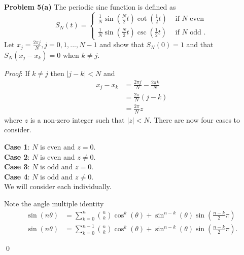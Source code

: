 \documentclass[12pt]{article}
\newcommand{\problem}[1]{\hspace{-4 ex} \large \textbf{Problem #1} }
\renewenvironment{proof}{\hspace{-4 ex} \emph{Proof}:}{\qed}
\begin{document}
\problem{5(a)} The periodic sinc function is defined as
$$
S_N(t) = \begin{cases}
\frac{1}{N} \sin \left(\frac{N}{2}t \right) \cot \left( \frac{1}{2}t \right) & \text{ if } N \text{ even}\\
\frac{1}{N} \sin \left(\frac{N}{2}t \right) \csc \left(\frac{1}{2}t \right) & \text{ if } N \text{ odd .}
\end{cases}
$$
Let $x_j = \frac{2\pi j}{N}, j=0,1,...,N-1$ and show that $S_N(0)=1$ and that \\$S_N(x_j-x_k)=0$ when $k\neq j$.
\bigbreak

\begin{proof} If $k \neq j$ then $\vert j - k \vert < N$ and
	\begin{align*}
		x_j - x_k &= \frac{2\pi j}{N} - \frac{2\pi k}{N} \\
		&= \frac{2\pi}{N} (j-k) \\
		&= \frac{2\pi}{N}z
	\end{align*}
	where $z$ is a non-zero integer such that $\vert z \vert < N$. There are now four cases to consider. 
	\bigbreak
	
	\textbf{Case 1}: $N$ is even and $z=0$. \\
	\textbf{Case 2}: $N$ is even and $z \neq 0$. \\
	\textbf{Case 3}: $N$ is odd and $z=0$. \\
	\textbf{Case 4}: $N$ is odd and $z \neq 0$. \\
	We will consider each individually.
	\bigbreak
	
	Note the angle multiple identity
	\begin{align}
	\sin(n \theta) &= \sum_{k=0}^n {n \choose k} \cos^k(\theta) + \sin^{n-k}(\theta) \sin(\tfrac{n-k}{2}\pi) \nonumber \\
	\sin(n \theta) &= \sum_{k=0}^{n-1} {n \choose k} \cos^k(\theta) + \sin^{n-k}(\theta) \sin(\tfrac{n-k}{2}\pi) \text{.} \label{trig_ident}
	\end{align}
	

\end{proof}
\end{document}
